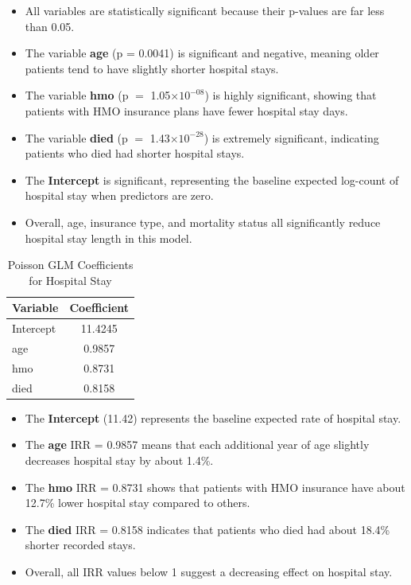 \documentclass[12pt,a4paper]{report}
\begin{document}
\begin{tcolorbox}[colback=blue!5!white,colframe=blue!70!black,title=Interpretation]
\begin{itemize}
    \item All variables are statistically significant because their p-values are far less than 0.05.
    \item The variable \textbf{age} (p = 0.0041) is significant and negative, meaning older patients tend to have slightly shorter hospital stays.
    \item The variable \textbf{hmo} (p $=$ 1.05$\times 10^{-08}$) is highly significant, showing that patients with HMO insurance plans have fewer hospital stay days.
    \item The variable \textbf{died} (p $=$ 1.43$\times 10^{-28}$) is extremely significant, indicating patients who died had shorter hospital stays.
    \item The \textbf{Intercept} is significant, representing the baseline expected log-count of hospital stay when predictors are zero.
    \item Overall, age, insurance type, and mortality status all significantly reduce hospital stay length in this model.
\end{itemize}
\end{tcolorbox}
\begin{table}[h!]
\centering
\begin{tabular}{|l|c|}
\hline
\textbf{Variable} & \textbf{Coefficient} \\ \hline
Intercept & 11.4245 \\ \hline
age       & 0.9857  \\ \hline
hmo       & 0.8731  \\ \hline
died      & 0.8158  \\ \hline
\end{tabular}
\caption{Poisson GLM Coefficients for Hospital Stay}
\label{tab:poisson_glm_coef_stay}
\end{table}

\begin{tcolorbox}[colback=blue!5!white,colframe=blue!70!black,title=Interpretation]
\begin{itemize}
    \item The \textbf{Intercept} (11.42) represents the baseline expected rate of hospital stay.
    \item The \textbf{age} IRR = 0.9857 means that each additional year of age slightly decreases hospital stay by about 1.4\%.
    \item The \textbf{hmo} IRR = 0.8731 shows that patients with HMO insurance have about 12.7\% lower hospital stay compared to others.
    \item The \textbf{died} IRR = 0.8158 indicates that patients who died had about 18.4\% shorter recorded stays.
    \item Overall, all IRR values below 1 suggest a decreasing effect on hospital stay.
\end{itemize}
\end{tcolorbox}
\clearpage
\end{document}
